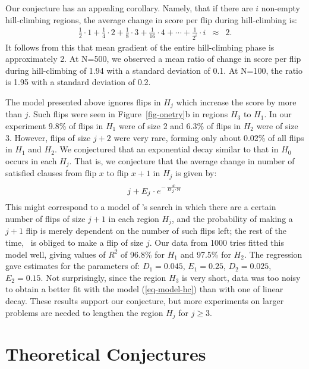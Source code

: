 Our conjecture has an appealing corollary.  
Namely, that if there are $i$ non-empty hill-climbing regions,
the average change in score per flip during hill-climbing is:
\begin{eqnarray}
\frac{1}{2}\cdot 1 + \frac{1}{4}\cdot 2 +  \frac{1}{8}\cdot 3  +  \frac{1}{16}\cdot 4 + \cdots
+ \frac{1}{2^i}\cdot i
&\approx&2.
\end{eqnarray}
It follows from this that mean gradient of the entire
hill-climbing phase is approximately 2.
At N=500,
we observed a mean ratio of change in score per flip during hill-climbing
of 1.94 with a standard deviation of 0.1. At N=100, the
ratio is 1.95 with a standard deviation of 0.2.

The model presented above ignores
flips in $H_j$ which increase the score by
more than $j$.  Such flips were seen in Figure~\ref{fig-onetry}b in
regions $H_3$ to $H_1$.
In our experiment 9.8\%
of flips in $H_1$ were of size 2 and 6.3\% of flips in $H_2$ were of size
3.  However, flips of size $j+2$ were very rare, forming only about
0.02\% of all flips in $H_1$ and $H_2$.
We conjectured that an exponential decay similar to that in  $H_0$ 
occurs in each $H_j$.  That is, 
we conjecture that the average change 
in number of satisfied clauses from flip $x$ to flip $x+1$ in $H_j$
is given by:
\begin{equation}
j +  E_j\cdot  e^{-\frac{x}{D_j\cdot \mbox{\rm \tiny N}}}
\label{eq-model-hc}
\end{equation}
This might correspond to a model of \GSAT's search in which
there are a certain number of flips of size $j+1$ in each region
$H_j$, and the probability of making a $j+1$ flip 
is merely dependent on the number of such flips left;
the rest of the time, \GSAT\ is obliged to make a flip of size $j$.
Our data from 1000 tries fitted this model well, giving values of $R^2$
of 96.8\% for $H_1$ and 97.5\% for $H_2$.  The regression gave estimates
for the parameters of:
$D_1 = 0.045$, $E_1 = 0.25$, $D_2 = 0.025$, $E_2 = 0.15$.
Not surprisingly, since the region $H_3$ is very short, data was too noisy
to obtain a better fit with the model (\ref{eq-model-hc}) than with one
of linear decay.  These results  support our conjecture, but 
more experiments on larger problems are needed
to lengthen the region $H_j$ for $j \geq 3$.


\section{Theoretical Conjectures}
\label{sec-theory}

